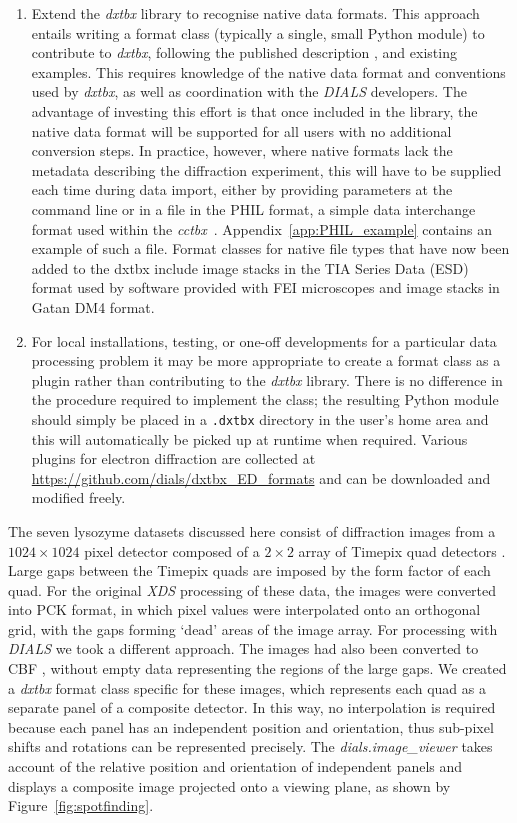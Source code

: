 \documentclass[preprint]{iucr}
\newcommand{\cctbx}{\emph{cctbx}\xspace}
\newcommand{\dxtbx}{\emph{dxtbx}\xspace}
\newcommand{\dials}{\emph{DIALS}\xspace}
\newcommand{\dialsimageviewer}{\emph{dials.image\_viewer}\xspace}
\newcommand{\code}{\texttt}
\newcommand{\xds}{\emph{XDS}\xspace}
\newcounter{DWCounter}
\newcommand{\DW}[1]{%
   \stepcounter{DWCounter}%
   {\color{red}{\textbf{DW \#\arabic{DWCounter}: }#1}}%
  }
\begin{document}
\begin{enumerate}
  \item Extend the \dxtbx library to recognise native data formats. This
  approach entails writing a format class (typically a single, small Python
  module) to contribute to \dxtbx, following the published description
  \cite{Parkhurst2014}, and existing examples. This requires knowledge of the
  native data format and conventions used by \dxtbx, as well as coordination
  with the \dials developers. The advantage of investing this effort is that
  once included in the library, the native data format will be supported for
  all users with no additional conversion steps. In practice, however, where
  native formats lack the metadata describing the diffraction experiment, this
  will have to be supplied each time during data import, either by providing
  parameters at the command line or in a file in the PHIL format, a simple data
  interchange format used within the \cctbx~\cite{Grosse-Kunstleve2002}.
  Appendix~\ref{app:PHIL_example} contains an example of such a file. Format
  classes for native file types that have now been added to the dxtbx include
  image stacks in the TIA Series Data (ESD) format used by software provided
  with FEI microscopes and image stacks in Gatan DM4 format.

  \item For local installations, testing, or one-off developments for a
  particular data processing problem it may be more appropriate to create a
  format class as a plugin rather than contributing to the \dxtbx library.
  There is no difference in the procedure required to implement the class; the
  resulting Python module should simply be placed in a \code{.dxtbx} directory
  in the user's home area and this will automatically be picked up at runtime
  when required. Various plugins for electron diffraction are collected at
  \url{https://github.com/dials/dxtbx_ED_formats} and can be downloaded and
  modified freely.

\end{enumerate}

The seven lysozyme datasets discussed here consist of diffraction images from a
$1024\times1024$ pixel detector composed of a $2\times2$ array of Timepix quad detectors
\cite{Clabbers2017}. Large gaps between the Timepix quads are imposed by the
form factor of each quad. For the original \xds processing of these data, the
images were converted into PCK format, in which pixel values were interpolated
onto an orthogonal grid, with the gaps forming `dead' areas of the image array.
For processing with \dials we took a different approach. The images had also
been converted to CBF \DW{any more details here - from Tim?}, without empty data
representing the regions of the large gaps. We created a \dxtbx format class
specific for these images, which represents each quad as a separate panel of a
composite detector. In this way, no interpolation is required because each
panel has an independent position and orientation, thus sub-pixel shifts and
rotations can be represented precisely. The \dialsimageviewer takes account
of the relative position and orientation of independent panels and displays a
composite image projected onto a viewing plane, as shown by
Figure~\ref{fig:spotfinding}.
\end{document}
